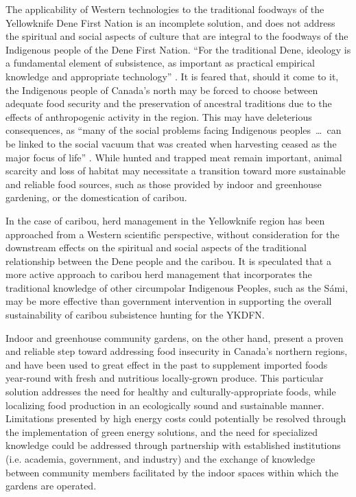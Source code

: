 \documentclass{report}
\begin{document}
\hspace{24pt} The applicability of Western technologies to the traditional foodways of the Yellowknife Dene First Nation is an incomplete solution, and does not address the spiritual and social aspects of culture that are integral to the foodways of the Indigenous people of the Dene First Nation.
``For the traditional Dene, ideology is a fundamental element of subsistence, as important as practical empirical knowledge and appropriate technology'' \parencite[64]{lorecapturingtraditional}.
It is feared that, should it come to it, the Indigenous people of Canada's north may be forced to choose between adequate food security and the preservation of ancestral traditions due to the effects of anthropogenic activity in the region.
This may have deleterious consequences, as ``many of the social problems facing Indigenous peoples~\ldots~can be linked to the social vacuum that was created when harvesting ceased as the major focus of life'' \parencite[269]{socialculturalcapital}.
While hunted and trapped meat remain important, animal scarcity and loss of habitat may necessitate a transition toward more sustainable and reliable food sources, such as those provided by indoor and greenhouse gardening, or the domestication of caribou.

\hspace{24pt} In the case of caribou, herd management in the Yellowknife region has been approached from a Western scientific perspective, without consideration for the downstream effects on the spiritual and social aspects of the traditional relationship between the Dene people and the caribou.
It is speculated that a more active approach to caribou herd management that incorporates the traditional knowledge of other circumpolar Indigenous Peoples, such as the S\'ami, may be more effective than government intervention in supporting the overall sustainability of caribou subsistence hunting for the YKDFN.

\hspace{24pt} Indoor and greenhouse community gardens, on the other hand, present a proven and reliable step toward addressing food insecurity in Canada's northern regions, and have been used to great effect in the past to supplement imported foods year-round with fresh and nutritious locally-grown produce.
This particular solution addresses the need for healthy and culturally-appropriate foods, while localizing food production in an ecologically sound and sustainable manner.
Limitations presented by high energy costs could potentially be resolved through the implementation of green energy solutions, and the need for specialized knowledge could be addressed through partnership with established institutions (i.e. academia, government, and industry) and the exchange of knowledge between community members facilitated by the indoor spaces within which the gardens are operated.
\end{document}
